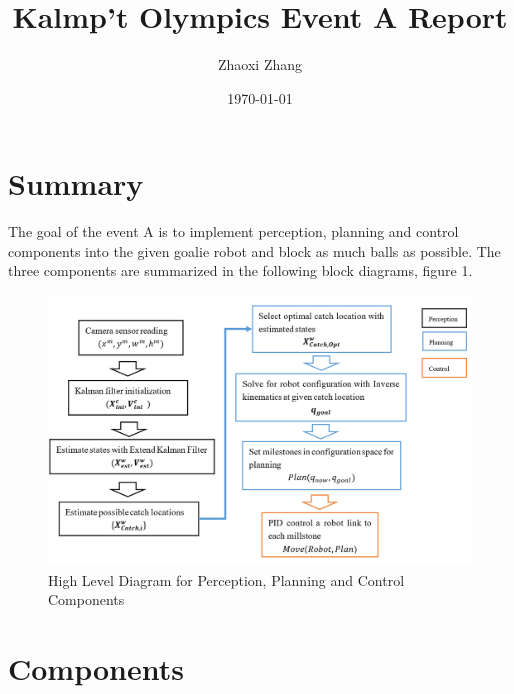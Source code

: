 \documentclass[a4paper]{article}
\title{Kalmp’t Olympics Event A Report}
\author{Zhaoxi Zhang}
\date{\today}
\begin{document}
\maketitle

\section{Summary}
The goal of the event A is to implement perception, planning and control components into the given goalie robot and block as much balls as possible. The three components are summarized in the following block diagrams, figure 1. 
\begin{figure}[h]
\centering
\includegraphics[scale=1.05]{HighLevelDiagram.PNG}
\caption{High Level Diagram for Perception, Planning and Control Components}
\end{figure}

\section{Components}
\end{document}
